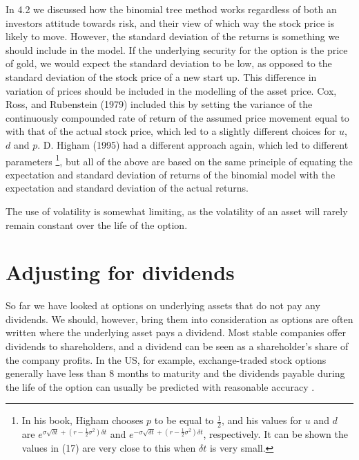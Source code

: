 \documentclass[letterpaper,12pt]{article}
\theoremstyle{plain}
\numberwithin{equation}{section}
\begin{document}
In 4.2 we discussed how the binomial tree method works regardless of both an investors attitude towards risk, and their view of which way the stock price is likely to move. However, the standard deviation of the returns is something we should include in the model. If the underlying security for the option is the price of gold, we would expect the standard deviation to be low, as opposed to the standard deviation of the stock price of a new start up. This difference in variation of prices should be included in the modelling of the asset price. Cox, Ross, and Rubenstein (1979) \cite{CRR} included this by setting the variance of the continuously compounded rate of return of the assumed price movement equal to with that of the actual stock price, which led to a slightly different choices for $u$, $d$ and $p$. D. Higham (1995) \cite{FOV} had a different approach again, which led to different parameters \footnote{In his book, Higham chooses $p$ to be equal to $\frac{1}{2}$, and his values for $u$ and $d$ are $e^{\sigma\sqrt{\delta t}+(r-\frac{1}{2}\sigma^2)\delta t}$ and $e^{-\sigma\sqrt{\delta t}+(r-\frac{1}{2}\sigma^2)\delta t}$, respectively. It can be shown the values in (17) are very close to this when $\delta t$ is very small.}, but all of the above are based on the same principle of equating the expectation and standard deviation of returns of the binomial model with the expectation and standard deviation of the actual returns.

The use of volatility is somewhat limiting, as the volatility of an asset will rarely remain constant over the life of the option.


\section{Adjusting for dividends}
So far we have looked at options on underlying assets that do not pay any dividends. We should, however, bring them into consideration as options are often written where the underlying asset pays a dividend. Most stable companies offer dividends to shareholders, and a dividend can be seen as a shareholder's share of the company profits. In the US, for example, exchange-traded stock options generally have less than 8 months to maturity and the dividends payable during the life of the option can usually be predicted with reasonable accuracy \cite{OFD}.
\end{document}
